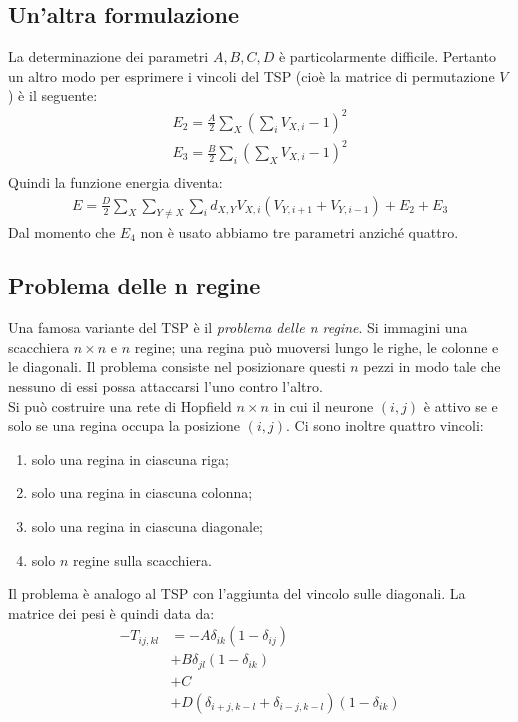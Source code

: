 \subsection{Un'altra formulazione} %
\label{sub:un_altra_formulazione}
La determinazione dei parametri $A, B, C, D$ è particolarmente difficile. Pertanto un altro modo per esprimere i vincoli del TSP (cioè la matrice di permutazione $V$) è il seguente:
\begin{align*}
	E_2 = \frac{A}{2} \sum_X \left(\sum_i V_{X, i} - 1 \right) ^ 2 \tag{Vincolo sulle righe} \\
	E_3 = \frac{B}{2} \sum_i \left(\sum_X V_{X, i} - 1 \right) ^ 2 \tag{Vincolo sulle colonne} \\
\end{align*}
Quindi la funzione energia diventa:
\begin{align*}
	E = \frac{D}{2} \sum_{X} \sum_{Y \neq X} \sum_i d_{X,Y} V_{X,i}(V_{Y, i + 1} + V_{Y, i - 1}) + E_2 + E_3
\end{align*}
Dal momento che $E_4$ non è usato abbiamo tre parametri anziché quattro.


\subsection{Problema delle n regine} %
\label{sub:problema_delle_n_regine}
Una famosa variante del TSP è il \emph{problema delle n regine}. Si immagini una scacchiera $n \times n$ e $n$ regine; una regina può muoversi lungo le righe, le colonne e le diagonali. Il problema consiste nel posizionare questi $n$ pezzi in modo tale che nessuno di essi possa attaccarsi l'uno contro l'altro.\\

Si può costruire una rete di Hopfield $n \times n$ in cui il neurone $(i,j)$ è attivo se e solo se una regina occupa la posizione $(i,j)$. Ci sono inoltre quattro vincoli:
\begin{enumerate}
    \item solo una regina in ciascuna riga;
    \item solo una regina in ciascuna colonna;
    \item solo una regina in ciascuna diagonale;
    \item solo $n$ regine sulla scacchiera.
\end{enumerate}

\newpage

Il problema è analogo al TSP con l'aggiunta del vincolo sulle diagonali. La matrice dei pesi è quindi data da:
\begin{align*}
	- T_{ij,kl} &= - A \delta_{ik} (1 - \delta_{ij}) \tag{peso inibitorio in ogni riga}\\
	& + B \delta_{jl} (1 - \delta_{ik}) \tag{peso inibitorio in ogni colonna} \\
	& + C  \qquad \tag{Inibizione globale}\\
	& + D (\delta_{i+j,k-l} + \delta_{i-j, k-l})(1 - \delta_{ik}) \tag{peso inibitorio sulle diagonale}
\end{align*}

